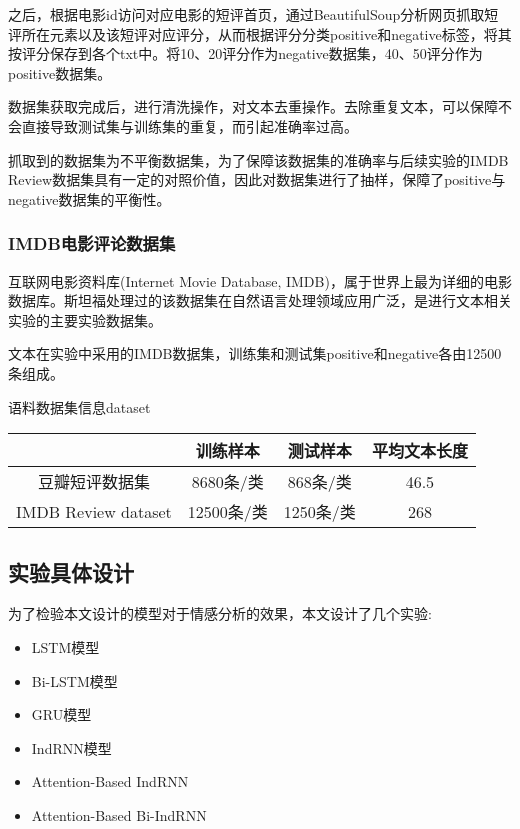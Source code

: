 \documentclass[a4paper,AutoFakeBold,oneside,12pt]{book}
\begin{document}
之后，根据电影id访问对应电影的短评首页，通过BeautifulSoup分析网页抓取短评所在元素以及该短评对应评分，从而根据评分分类positive和negative标签，将其按评分保存到各个txt中。将10、20评分作为negative数据集，40、50评分作为positive数据集。

数据集获取完成后，进行清洗操作，对文本去重操作。去除重复文本，可以保障不会直接导致测试集与训练集的重复，而引起准确率过高。

抓取到的数据集为不平衡数据集，为了保障该数据集的准确率与后续实验的IMDB Review数据集具有一定的对照价值，因此对数据集进行了抽样，保障了positive与negative数据集的平衡性。

\subsubsection{IMDB电影评论数据集}

互联网电影资料库(Internet Movie Database, IMDB)，属于世界上最为详细的电影数据库。斯坦福处理过的该数据集在自然语言处理领域应用广泛，是进行文本相关实验的主要实验数据集\cite{maasLearningWordVectors2011}。

文本在实验中采用的IMDB数据集，训练集和测试集positive和negative各由12500条组成。

\begin{bupttable}{语料数据集信息}{dataset}
    \begin{tabular}{c|c c c}
		\hline  & 训练样本 & 测试样本 & 平均文本长度\\
		\hline  豆瓣短评数据集 & 8680条/类 & 868条/类 & 46.5 \\
		\hline IMDB Review dataset & 12500条/类 & 1250条/类 & 268 \\
		\hline
    \end{tabular}
\end{bupttable}

\subsection{实验具体设计}
为了检验本文设计的模型对于情感分析的效果，本文设计了几个实验:

\begin{itemize}
    \item LSTM模型
    \item Bi-LSTM模型
    \item GRU模型
    \item IndRNN模型
    \item Attention-Based IndRNN
    \item Attention-Based Bi-IndRNN
\end{itemize}
\end{document}
